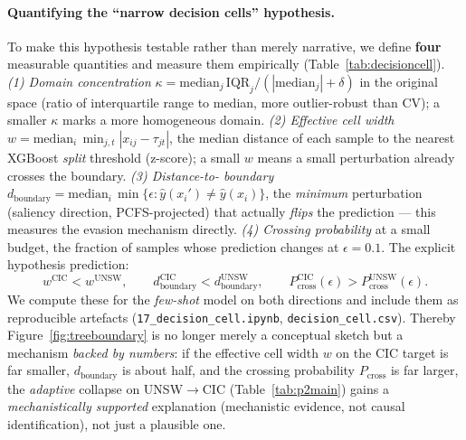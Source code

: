 \documentclass[preprint,12pt,authoryear]{elsarticle}
\begin{document}
\paragraph{Quantifying the ``narrow decision cells'' hypothesis.} To make this
hypothesis testable rather than merely narrative, we define \textbf{four} measurable
quantities and measure them empirically (Table~\ref{tab:decisioncell}).
\emph{(1) Domain concentration} $\kappa = \mathrm{median}_j\,\mathrm{IQR}_j /
(|\mathrm{median}_j| + \delta)$ in the original space (ratio of interquartile range
to median, more outlier-robust than CV); a smaller $\kappa$ marks a more homogeneous
domain. \emph{(2) Effective cell width}
$w = \mathrm{median}_i\, \min_{j,t} |x_{ij} - \tau_{jt}|$, the median distance of
each sample to the nearest XGBoost \emph{split} threshold (z-score); a small $w$
means a small perturbation already crosses the boundary. \emph{(3) Distance-to-
boundary} $d_{\text{boundary}} = \mathrm{median}_i\, \min\{\epsilon :
\hat{y}(x_i')\neq \hat{y}(x_i)\}$, the \emph{minimum} perturbation (saliency
direction, PCFS-projected) that actually \emph{flips} the prediction --- this
measures the evasion mechanism directly. \emph{(4) Crossing probability} at a small
budget, the fraction of samples whose prediction changes at $\epsilon{=}0.1$. The
explicit hypothesis prediction:
\begin{equation}
w^{\text{CIC}} < w^{\text{UNSW}}, \qquad
d_{\text{boundary}}^{\text{CIC}} < d_{\text{boundary}}^{\text{UNSW}}, \qquad
P_{\text{cross}}^{\text{CIC}}(\epsilon) > P_{\text{cross}}^{\text{UNSW}}(\epsilon).
\end{equation}
We compute these for the \emph{few-shot} model on both directions and include them
as reproducible artefacts (\texttt{17\_decision\_cell.ipynb},
\texttt{decision\_cell.csv}). Thereby Figure~\ref{fig:treeboundary} is no longer
merely a conceptual sketch but a mechanism \emph{backed by numbers}: if
the effective cell width $w$ on the CIC target is far smaller, $d_{\text{boundary}}$
is about half, and the crossing probability $P_{\text{cross}}$ is far larger, the
\emph{adaptive} collapse on UNSW$\rightarrow$CIC (Table~\ref{tab:p2main}) gains a
\emph{mechanistically supported} explanation (mechanistic evidence, not causal
identification), not just a plausible one.
\end{document}

